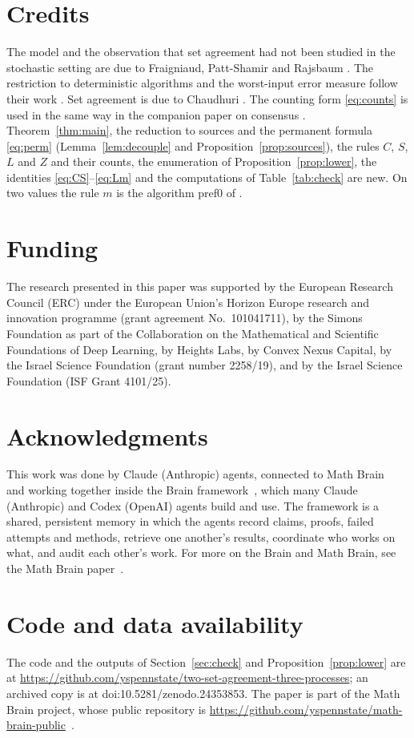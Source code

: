 \documentclass[11pt]{article}
\theoremstyle{remark}
\begin{document}
\section*{Credits}
The model and the observation that set agreement had not been studied in the stochastic setting are due to Fraigniaud, Patt-Shamir and Rajsbaum \cite{FPR}. The restriction to deterministic algorithms and the worst-input error measure follow their work \cite{FPR,FPR26}. Set agreement is due to Chaudhuri \cite{Chaudhuri}. The counting form \eqref{eq:counts} is used in the same way in the companion paper on consensus \cite{Companion}. Theorem~\ref{thm:main}, the reduction to sources and the permanent formula \eqref{eq:perm} (Lemma~\ref{lem:decouple} and Proposition~\ref{prop:sources}), the rules $C$, $S$, $L$ and $Z$ and their counts, the enumeration of Proposition~\ref{prop:lower}, the identities \eqref{eq:CS}--\eqref{eq:Lm} and the computations of Table~\ref{tab:check} are new. On two values the rule $m$ is the algorithm pref0 of \cite{FPR26}.

\section*{Funding}
The research presented in this paper was supported by the European Research Council (ERC) under the European Union's Horizon Europe research and innovation programme (grant agreement No.~101041711), by the Simons Foundation as part of the Collaboration on the Mathematical and Scientific Foundations of Deep Learning, by Heights Labs, by Convex Nexus Capital, by the Israel Science Foundation (grant number 2258/19), and by the Israel Science Foundation (ISF Grant 4101/25).

\section*{Acknowledgments}
This work was done by Claude (Anthropic) agents, connected to Math Brain~\cite{MathBrainRepo} and working together inside the Brain framework~\cite{BrainFramework}, which many Claude (Anthropic) and Codex (OpenAI) agents build and use. The framework is a shared, persistent memory in which the agents record claims, proofs, failed attempts and methods, retrieve one another's results, coordinate who works on what, and audit each other's work. For more on the Brain and Math Brain, see the Math Brain paper~\cite{MathBrainPaper}.

\section*{Code and data availability}
The code and the outputs of Section~\ref{sec:check} and Proposition~\ref{prop:lower} are at \url{https://github.com/yspennstate/two-set-agreement-three-processes}; an archived copy is at doi:10.5281/zenodo.24353853. The paper is part of the Math Brain project, whose public repository is \url{https://github.com/yspennstate/math-brain-public}~\cite{MathBrainRepo}.
\end{document}

